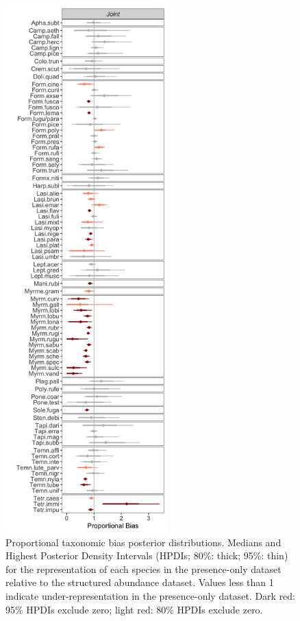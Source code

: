 \documentclass[preprint,final,times,12pt,3p]{elsarticle}
\begin{document}
\begin{figure}
	\centering\includegraphics[height=8in]{../../../ms/1_Ecography/1/figs/D.png}
	\caption{\label{fig:D} Proportional taxonomic bias posterior distributions. Medians and Highest Posterior Density Intervals (HPDIs; 80\%: thick; 95\%: thin) for the representation of each species in the presence-only dataset relative to the structured abundance dataset. Values less than 1 indicate under-representation in the presence-only dataset. Dark red: 95\% HPDIs exclude zero; light red: 80\% HPDIs exclude zero. }
\end{figure}
\end{document}
